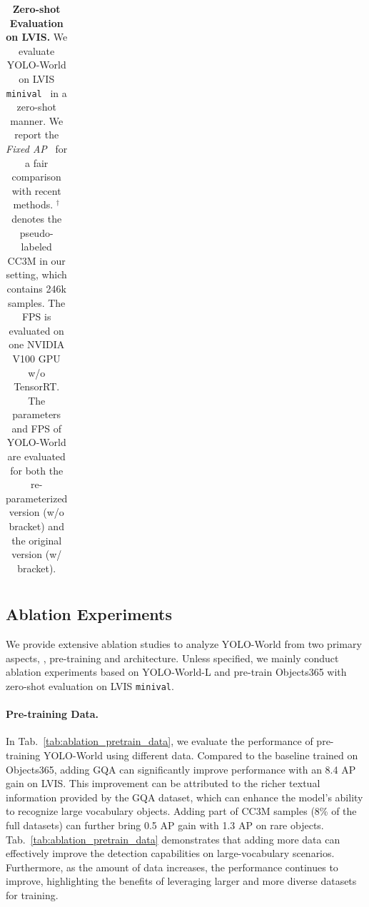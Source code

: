 \documentclass[10pt,twocolumn,letterpaper]{article}
\newcommand{\name}{YOLO-World}
\begin{document}
\begin{table}[]
{\begin{tabular}{llcl c cccc}
    \bottomrule
    \end{tabular}}
    \vspace{-4pt}
    \caption{\textbf{Zero-shot Evaluation on LVIS.} We evaluate \name{} on LVIS \texttt{minival}~\cite{mdetr} in a zero-shot manner. We report the \textit{Fixed AP}~\cite{largevocabdevil} for a fair comparison with recent methods. $^{\dagger}$ denotes the pseudo-labeled CC3M in our setting, which contains 246k samples. The FPS is evaluated on one NVIDIA V100 GPU w/o TensorRT. The parameters and FPS of \name{} are evaluated for both the re-parameterized version (w/o bracket) and the original version (w/ bracket).}
    \label{tab:zero_shot_lvis}
\end{table}



\subsection{Ablation Experiments}
We provide extensive ablation studies to analyze \name{} from two primary aspects, \ie, pre-training and architecture.
Unless specified, we mainly conduct ablation experiments based on \name{}-L and pre-train Objects365 with zero-shot evaluation on LVIS \texttt{minival}.

\paragraph{Pre-training Data.}
In Tab.~\ref{tab:ablation_pretrain_data}, we evaluate the performance of pre-training \name{} using different data.
Compared to the baseline trained on Objects365, adding GQA can significantly improve performance with an 8.4 AP gain on LVIS.
This improvement can be attributed to the richer textual information provided by the GQA dataset, which can enhance the model's ability to recognize large vocabulary objects.
Adding part of CC3M samples (8\% of the full datasets) can further bring 0.5 AP gain with 1.3 AP on rare objects.
Tab.~\ref{tab:ablation_pretrain_data} demonstrates that adding more data can effectively improve the detection capabilities on large-vocabulary scenarios.
Furthermore, as the amount of data increases, the performance continues to improve, highlighting the benefits of leveraging larger and more diverse datasets for training.
\end{document}
